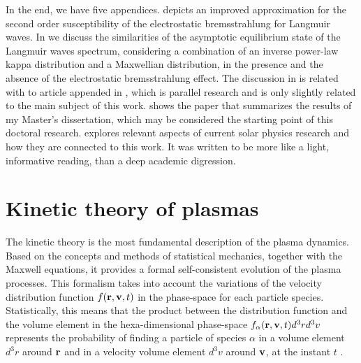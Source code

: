 \documentclass[12pt,a4paper,ruledheader]{report}
\begin{document}
In the end, we have five appendices.  depicts an improved
approximation for the second order susceptibility of the electrostatic
bremsstrahlung for Langmuir waves. In  we discuss the
similarities of the asymptotic equilibrium state of the Langmuir waves
spectrum, considering a combination of an inverse power-law kappa
distribution and a Maxwellian distribution, in the presence and the
absence of the electrostatic bremsstrahlung effect. The discussion in
 is related with to article appended in , which
is parallel research and is only slightly related to the main subject
of this work.  shows the paper that summarizes the results
of my Master’s dissertation, which may be considered the starting point
of this doctoral research.  explores relevant aspects of
current solar physics research and how they are connected to this work.
It was written to be more like a light, informative reading, than a
deep academic digression.


\chapter{Kinetic theory of plasmas}
\label{cha:kin-theo}


The kinetic theory is the most fundamental description of the
plasma dynamics. Based on the concepts and methods of statistical
mechanics, together with the Maxwell equations, it provides a
formal self-consistent evolution of the plasma processes. This
formalism takes into account the variations of the velocity
distribution function $f({\bf r},{\bf v},t)$ in the phase-space
for each particle species. Statistically, this means that the
product between the distribution function and the volume element
in the hexa-dimensional phase-space $f_\alpha({\bf r},{\bf v},t)d^3r d^3v$
represents the probability of finding a particle of species
$\alpha$ in a volume element $d^3r$ around ${\bf r}$ and in a
velocity volume element $d^3v$ around ${\bf v}$, at the instant
$t$ \cite{klimo,klimon}.
\end{document}
